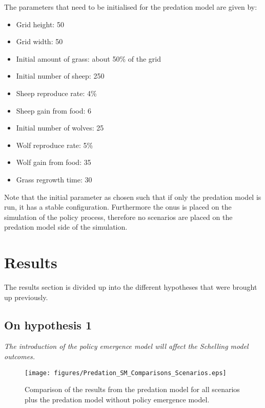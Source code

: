 \documentclass[12pt]{article}
\begin{document}
The parameters that need to be initialised for the predation model are given by:

\begin{itemize}
\item Grid height: 50
\item Grid width: 50
\item Initial amount of grass: about 50\% of the grid
\item Initial number of sheep: 250
\item Sheep reproduce rate: 4\%
\item Sheep gain from food: 6
\item Initial number of wolves: 25
\item Wolf reproduce rate: 5\%
\item Wolf gain from food: 35
\item Grass regrowth time: 30
\end{itemize}

Note that the initial parameter as chosen such that if only the predation model is run, it has a stable configuration. Furthermore the onus is placed on the simulation of the policy process, therefore no scenarios are placed on the predation model side of the simulation.


\section{Results}
\label{sec:results}

The results section is divided up into the different hypotheses that were brought up previously.

\subsection{On hypothesis 1}
\label{ssec:H1}

\emph{The introduction of the policy emergence model will affect the Schelling model outcomes.}

\begin{figure}[ht]
\centering
\texttt{[image: figures/Predation\_SM\_Comparisons\_Scenarios.eps]}
\caption{Comparison of the results from the predation model for all scenarios plus the predation model without policy emergence model.}
\label{fig:Predation_SM_Comparisons_Scenarios}
\end{figure}
\end{document}
